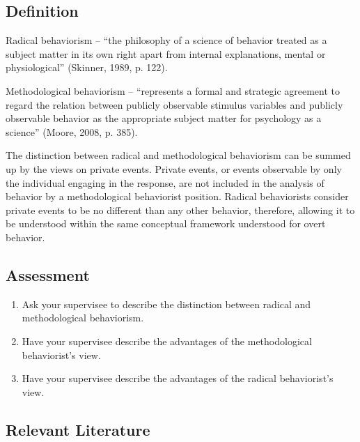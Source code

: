 \subsection{Definition}
Radical behaviorism – ``the philosophy of a science of behavior treated as a subject matter in its own right apart from internal explanations, mental or physiological'' (Skinner, 1989, p. 122).

Methodological behaviorism – ``represents a formal and strategic agreement to regard the relation between publicly observable stimulus variables and publicly observable behavior as the appropriate subject matter for psychology as a science'' (Moore, 2008, p. 385).

The distinction between radical and methodological behaviorism can be summed up by the views on private events. Private events, or events observable by only the individual engaging in the response, are not included in the analysis of behavior by a methodological behaviorist position. Radical behaviorists consider private events to be no different than any other behavior, therefore, allowing it to be understood within the same conceptual framework understood for overt behavior.

\subsection{Assessment}
\begin{enumerate}
\item Ask your supervisee to describe the distinction between radical and methodological behaviorism.
\item Have your supervisee describe the advantages of the methodological behaviorist's view.
\item Have your supervisee describe the advantages of the radical behaviorist's view.
\end{enumerate}
%
\subsection{Relevant Literature}
\begin{refsection}
\nocite{test,alang2017police,clayton2018black}
\printbibliography[heading=none]
\end{refsection}
%
